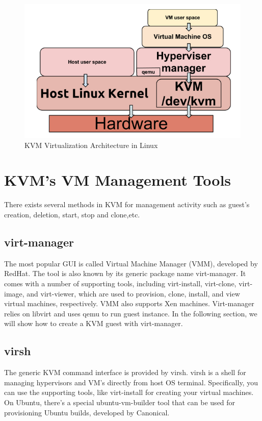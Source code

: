 \begin{figure}[htbp]
	\centering
		\includegraphics[scale = 0.6]{Figures/Figure7.png}
	\caption[KVM Virtualization Architecture in Linux]{KVM Virtualization Architecture in Linux}
	\label{fig:KVM Virtualization Architecture in Linux}
\end{figure}


\section{KVM’s VM Management Tools}

There exists several methods in KVM for management activity such as guest’s creation, deletion, start, stop and clone,etc.

\subsection{virt-manager}
The most popular GUI is called Virtual Machine Manager (VMM), developed by RedHat. 
The tool is also known by its generic package name virt-manager. 
It comes with a number of supporting tools, including virt-install, virt-clone, virt-image, and virt-viewer, 
which are used to provision, clone, install, and view virtual machines, respectively. 
VMM also supports Xen machines. Virt-manager relies on libvirt and uses qemu to run guest instance. 
In the following section, we will show how to create a KVM guest with virt-manager.

\subsection{virsh}
The generic KVM command interface is provided by virsh. virsh is a shell for managing hypervisors and VM’s directly from host OS terminal. 
Specifically, you can use the supporting tools, like virt-install for creating your virtual machines. 
On Ubuntu, there's a special ubuntu-vm-builder tool that can be used for provisioning Ubuntu builds, developed by Canonical.

